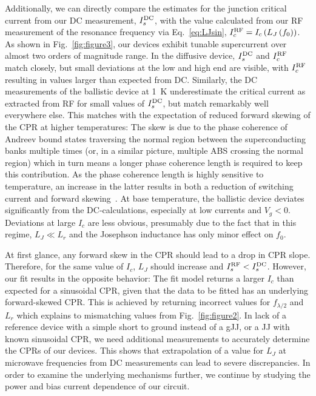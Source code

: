 Additionally, we can directly compare the estimates for the junction critical current from our DC measurement, $I_s^{\rm DC}$, with the value calculated from our RF measurement of the resonance frequency via Eq.~\ref{eq:LJsin}, $I_c^{\rm RF}=I_c\left(L_J\left(f_0\right)\right)$. 
%
As shown in Fig.~\ref{fig:figure3}, our devices exhibit tunable supercurrent over almost two orders of magnitude range.
%
In the diffusive device, $I_s^{\rm DC}$ and $I_c^{\rm RF}$ match closely, but small deviations at the low and high end are visible, with $I_c^{\rm RF}$ resulting in values larger than expected from DC.
%
Similarly, the DC measurements of the ballistic device at \SI{1}{\kelvin} underestimate the critical current as extracted from RF for small values of $I_s^{\rm DC}$, but match remarkably well everywhere else.
%
This matches with the expectation of reduced forward skewing of the CPR at higher temperatures:
%
The skew is due to the phase coherence of Andreev bound states traversing the normal region between the superconducting banks multiple times (or, in a similar picture, multiple ABS crossing the normal region) which in turn means a longer phase coherence length is required to keep this contribution.
%
As the phase coherence length is highly sensitive to temperature, an increase in the latter results in both a reduction of switching current and forward skewing~\cite{fuechsleEffectMicrowavesCurrentPhase2009,hagymasiJosephsonCurrentBallistic2010,black-schafferStronglyAnharmonicCurrentphase2010,rakytaMagneticFieldOscillations2016,englishObservationNonsinusoidalCurrentphase2016}.
%
At base temperature, the ballistic device deviates significantly from the DC-calculations, especially at low currents and $V_g<0$.
%
Deviations at large $I_c$ are less obvious, presumably due to the fact that in this regime, $L_J \ll L_r$ and the Josephson inductance has only minor effect on $f_0$.

At first glance, any forward skew in the CPR should lead to a drop in CPR slope.
%
Therefore, for the same value of $I_c$, $L_J$ should increase and $I_s^{\rm RF}<I_s^{\rm DC}$.
%
However, our fit results in the opposite behavior:
%
The fit model returns a larger $I_c$ than expected for a sinusoidal CPR, given that the data to be fitted has an underlying forward-skewed CPR.
%
This is achieved by returning incorrect values for $f_{\lambda/2}$ and $L_r$ which explains to mismatching values from Fig.~\ref{fig:figure2}.
%
In lack of a reference device with a simple short to ground instead of a gJJ, or a JJ with known sinusoidal CPR, we need additional measurements to accurately determine the CPRs of our devices.
%
This shows that extrapolation of a value for $L_J$ at microwave frequencies from DC measurements can lead to severe discrepancies.
%
In order to examine the underlying mechanisms further, we continue by studying the power and bias current dependence of our circuit.




